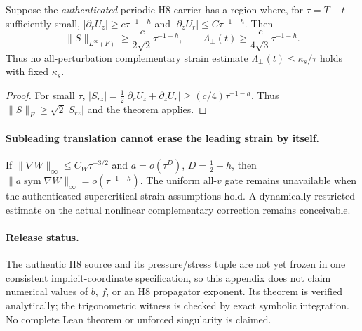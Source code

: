 \begin{proposition}
Suppose the \emph{authenticated} periodic H8 carrier has a region where, for $\tau=T-t$ sufficiently small,
$|\partial_rU_z|\ge c\tau^{-1-h}$ and
$|\partial_zU_r|\le C\tau^{-1+h}$.
Then
\[
\|S\|_{L^\infty(F)}\ge\frac c{2\sqrt2}\tau^{-1-h},
\qquad
\Lambda_\perp(t)\ge\frac c{4\sqrt3}\tau^{-1-h}.
\]
Thus no all-perturbation complementary strain estimate
$\Lambda_\perp(t)\le\kappa_s/\tau$ holds with fixed $\kappa_s$.
\end{proposition}
\begin{proof}
For small $\tau$, $|S_{rz}|=\tfrac12|\partial_rU_z+\partial_zU_r|
\ge (c/4)\tau^{-1-h}$. Thus $\|S\|_F\ge\sqrt2|S_{rz}|$ and the theorem applies.
\end{proof}

\paragraph{Subleading translation cannot erase the leading strain by itself.}
If $\|\nabla W\|_\infty\le C_W\tau^{-3/2}$ and
$a=o(\tau^{D})$, $D=\tfrac12-h$, then
$\|a\operatorname{sym}\nabla W\|_\infty=o(\tau^{-1-h})$.
The uniform all-$v$ gate remains unavailable when the authenticated
supercritical strain assumptions hold. A dynamically restricted estimate
on the actual nonlinear complementary correction remains conceivable.

\paragraph{Release status.}
The authentic H8 source and its pressure/stress tuple are not yet frozen in one consistent implicit-coordinate specification, so this appendix does not claim numerical values of $b$, $f$, or an H8 propagator exponent. Its theorem is verified analytically; the trigonometric witness is checked by exact symbolic integration. No complete Lean theorem or unforced singularity is claimed.
